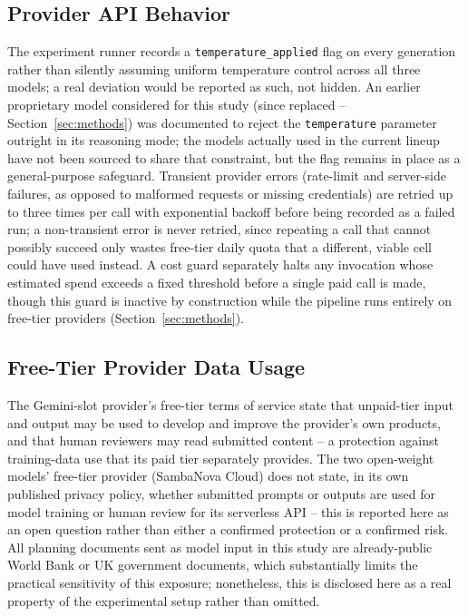 \documentclass[conference]{IEEEtran}
\begin{document}
\subsection{Provider API Behavior}
The experiment runner records a \texttt{temperature\_applied} flag on every
generation rather than silently assuming uniform temperature control across
all three models; a real deviation would be reported as such, not hidden.
An earlier proprietary model considered for this study (since replaced --
Section~\ref{sec:methods}) was documented to reject the
\texttt{temperature} parameter outright in its reasoning mode; the models
actually used in the current lineup have not been sourced to share that
constraint, but the flag remains in place as a general-purpose safeguard.
Transient provider errors (rate-limit and server-side failures, as opposed
to malformed requests or missing credentials) are retried up to three times
per call with exponential backoff before being recorded as a failed run; a
non-transient error is never retried, since repeating a call that cannot
possibly succeed only wastes free-tier daily quota that a different,
viable cell could have used instead. A cost guard separately halts any
invocation whose estimated spend exceeds a fixed threshold before a single
paid call is made, though this guard is inactive by construction while the
pipeline runs entirely on free-tier providers (Section~\ref{sec:methods}).

\subsection{Free-Tier Provider Data Usage}
The Gemini-slot provider's free-tier terms of service state that unpaid-tier
input and output may be used to develop and improve the provider's own
products, and that human reviewers may read submitted content -- a
protection against training-data use that its paid tier separately
provides. The two open-weight models' free-tier provider (SambaNova Cloud)
does not state, in its own published privacy policy, whether submitted
prompts or outputs are used for model training or human review for its
serverless API -- this is reported here as an open question rather than
either a confirmed protection or a confirmed risk. All planning documents
sent as model input in this study are already-public World Bank or UK
government documents, which substantially limits the practical sensitivity
of this exposure; nonetheless, this is disclosed here as a real property of
the experimental setup rather than omitted.
\end{document}
